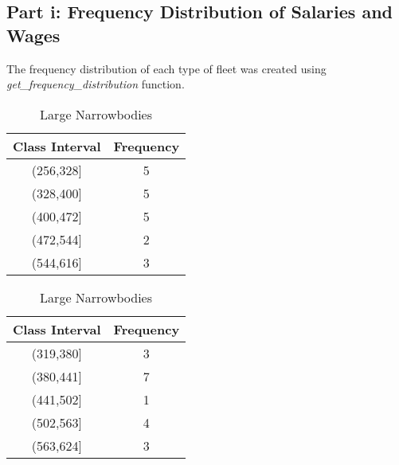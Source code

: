 \subsection{Part i: Frequency Distribution of Salaries and Wages}

The frequency distribution of each type of fleet was created using \textit{get\_frequency\_distribution} function.


\begin{table}[H]
    \centering
    \caption{Frequency Distribution of Salaries and Wages}

    \begin{minipage}{0.45\textwidth}
        \centering
        \caption*{Small Narrowbodies}
        \begin{tabular}{|c|c|}
            \hline
            Class Interval & Frequency \\
            \hline
            (256,328]      & 5         \\
            (328,400]      & 5         \\
            (400,472]      & 5         \\
            (472,544]      & 2         \\
            (544,616]      & 3         \\
            \hline
        \end{tabular}
    \end{minipage}%
    \hspace{0.05\textwidth} %
    \begin{minipage}{0.45\textwidth}
        \centering
        \caption*{Large Narrowbodies}
        \begin{tabular}{|c|c|}
            \hline
            Class Interval & Frequency \\
            \hline
            (319,380]      & 3         \\
            (380,441]      & 7         \\
            (441,502]      & 1         \\
            (502,563]      & 4         \\
            (563,624]      & 3         \\
            \hline
        \end{tabular}
    \end{minipage}
\end{table}

